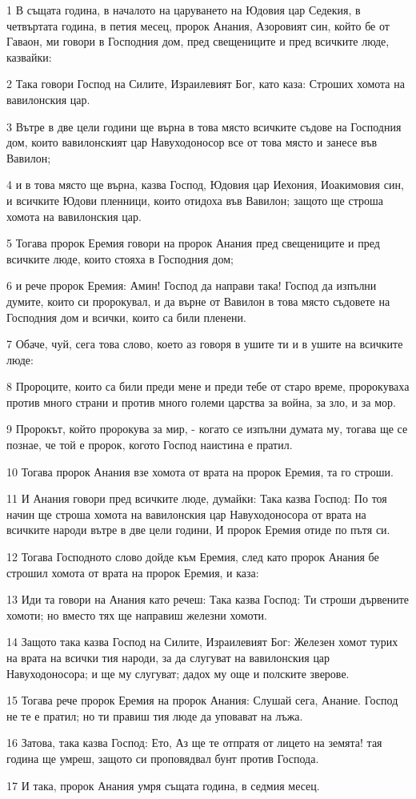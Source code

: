 \par 1 В същата година, в началото на царуването на Юдовия цар Седекия, в четвъртата година, в петия месец, пророк Анания, Азоровият син, който бе от Гаваон, ми говори в Господния дом, пред свещениците и пред всичките люде, казвайки:
\par 2 Така говори Господ на Силите, Израилевият Бог, като каза: Строших хомота на вавилонския цар.
\par 3 Вътре в две цели години ще върна в това място всичките съдове на Господния дом, които вавилонският цар Навуходоносор все от това място и занесе във Вавилон;
\par 4 и в това място ще върна, казва Господ, Юдовия цар Иехония, Иоакимовия син, и всичките Юдови пленници, които отидоха във Вавилон; защото ще строша хомота на вавилонския цар.
\par 5 Тогава пророк Еремия говори на пророк Анания пред свещениците и пред всичките люде, които стояха в Господния дом;
\par 6 и рече пророк Еремия: Амин! Господ да направи така! Господ да изпълни думите, които си пророкувал, и да върне от Вавилон в това място съдовете на Господния дом и всички, които са били пленени.
\par 7 Обаче, чуй, сега това слово, което аз говоря в ушите ти и в ушите на всичките люде:
\par 8 Пророците, които са били преди мене и преди тебе от старо време, пророкуваха против много страни и против много големи царства за война, за зло, и за мор.
\par 9 Пророкът, който пророкува за мир, - когато се изпълни думата му, тогава ще се познае, че той е пророк, когото Господ наистина е пратил.
\par 10 Тогава пророк Анания взе хомота от врата на пророк Еремия, та го строши.
\par 11 И Анания говори пред всичките люде, думайки: Така казва Господ: По тоя начин ще строша хомота на вавилонския цар Навуходоносора от врата на всичките народи вътре в две цели години, И пророк Еремия отиде по пътя си.
\par 12 Тогава Господното слово дойде към Еремия, след като пророк Анания бе строшил хомота от врата на пророк Еремия, и каза:
\par 13 Иди та говори на Анания като речеш: Така казва Господ: Ти строши дървените хомоти; но вместо тях ще направиш железни хомоти.
\par 14 Защото така казва Господ на Силите, Израилевият Бог: Железен хомот турих на врата на всички тия народи, за да слугуват на вавилонския цар Навуходоносора; и ще му слугуват; дадох му още и полските зверове.
\par 15 Тогава рече пророк Еремия на пророк Анания: Слушай сега, Анание. Господ не те е пратил; но ти правиш тия люде да уповават на лъжа.
\par 16 Затова, така казва Господ: Ето, Аз ще те отпратя от лицето на земята! тая година ще умреш, защото си проповядвал бунт против Господа.
\par 17 И така, пророк Анания умря същата година, в седмия месец.

